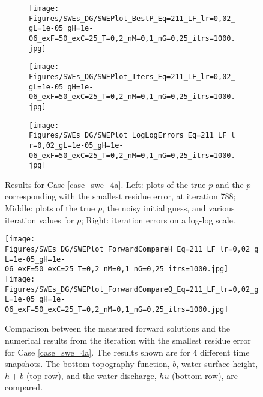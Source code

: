 \begin{figure}
\begin{subfigure}[t]{0.32\textwidth}
    \centering
    \texttt{[image: Figures/SWEs\_DG/SWEPlot\_BestP\_Eq=211\_LF\_lr=0,02\_gL=1e-05\_gH=1e-06\_exF=50\_exC=25\_T=0,2\_nM=0,1\_nG=0,25\_itrs=1000.jpg]}
\end{subfigure}
\begin{subfigure}[t]{0.32\textwidth}
    \centering
    \texttt{[image: Figures/SWEs\_DG/SWEPlot\_Iters\_Eq=211\_LF\_lr=0,02\_gL=1e-05\_gH=1e-06\_exF=50\_exC=25\_T=0,2\_nM=0,1\_nG=0,25\_itrs=1000.jpg]}
\end{subfigure}
\begin{subfigure}[t]{0.32\textwidth}
    \centering
    \texttt{[image: Figures/SWEs\_DG/SWEPlot\_LogLogErrors\_Eq=211\_LF\_lr=0,02\_gL=1e-05\_gH=1e-06\_exF=50\_exC=25\_T=0,2\_nM=0,1\_nG=0,25\_itrs=1000.jpg]}
\end{subfigure}
\caption{Results for Case \eqref{case_swe_4a}. Left: plots of the true $p$ and the $p$ corresponding with the smallest residue error, at iteration 788; Middle: plots of the true $p$, the noisy initial guess, and various iteration values for $p$; Right: iteration errors on a log-log scale.}
    \label{fig:swe_4A}
\end{figure}

\begin{figure}
    \centering
    \texttt{[image: Figures/SWEs\_DG/SWEPlot\_ForwardCompareH\_Eq=211\_LF\_lr=0,02\_gL=1e-05\_gH=1e-06\_exF=50\_exC=25\_T=0,2\_nM=0,1\_nG=0,25\_itrs=1000.jpg]}
    \texttt{[image: Figures/SWEs\_DG/SWEPlot\_ForwardCompareQ\_Eq=211\_LF\_lr=0,02\_gL=1e-05\_gH=1e-06\_exF=50\_exC=25\_T=0,2\_nM=0,1\_nG=0,25\_itrs=1000.jpg]}
    \caption{Comparison between the measured forward solutions and the numerical results from the iteration with the smallest residue error for Case \eqref{case_swe_4a}. The results shown are for 4 different time snapshots. The bottom topography function, $b$, water surface height, $h+b$ (top row), and the water discharge, $hu$ (bottom row), are compared.}
    \label{fig:swe_4A_2}
\end{figure}


